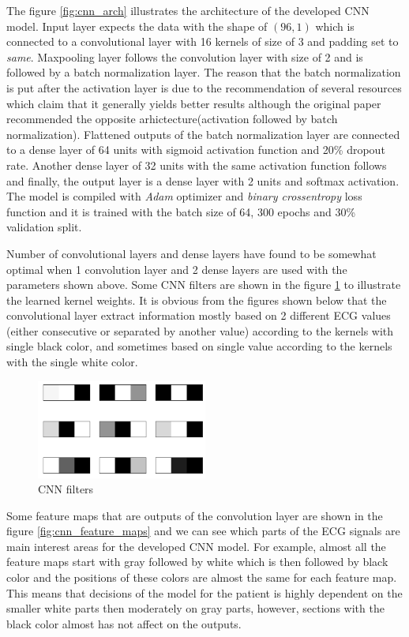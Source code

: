 \documentclass[a4paper]{article}
\begin{document}
The figure \ref{fig:cnn_arch} illustrates the architecture of the developed CNN model. Input layer expects the data with the shape of $(96, 1)$ which is connected to a convolutional layer with 16 kernels of 
size of 3 and padding set to \textit{same}. Maxpooling layer follows the convolution layer with size of 2 and is followed by a batch normalization layer. The reason that the batch normalization is put after 
the activation layer is due to the recommendation of several resources \cite{batchAfterActivation1,batchAfterActivation2} which claim that it generally yields better results although the original 
paper \cite{batchnorm} recommended the opposite arhictecture(activation followed by batch normalization). Flattened outputs of the batch normalization layer are connected to a dense layer of 64 units with 
sigmoid activation function and 20\% dropout rate. Another dense layer of 32 units with the same activation function follows and finally, the output layer is a dense layer with 2 units and softmax activation. 
The model is compiled with \textit{Adam} optimizer and \textit{binary crossentropy} loss function and it is trained with the batch size of 64, 300 epochs and 30\% validation split.

Number of convolutional layers and dense layers have found to be somewhat optimal when 1 convolution layer and 2 dense layers are used with the parameters shown above. Some CNN filters are shown in the 
figure \ref{fig:cnn_filters} to illustrate the learned kernel weights. It is obvious from the figures shown below that the convolutional layer extract information mostly based on 2 different ECG values 
(either consecutive or separated by another value) according to the kernels with single black color, and sometimes based on single value according to the kernels with the single white color.

\begin{figure}[h]
	\centering
	\includegraphics[width=0.5\textwidth]{img/cnn_filters.png}
	\caption{CNN filters}
	\label{fig:cnn_filters}
\end{figure}

Some feature maps that are outputs of the convolution layer are shown in the figure \ref{fig:cnn_feature_maps} and we can see which parts of the ECG signals are main interest areas for the developed CNN model. 
For example, almost all the feature maps start with gray followed by white which is then followed by black color and the positions of these colors are almost the same for each feature map. This means that 
decisions of the model for the patient is highly dependent on the smaller white parts then moderately on gray parts, however, sections with the black color almost has not affect on the outputs.
\end{document}
